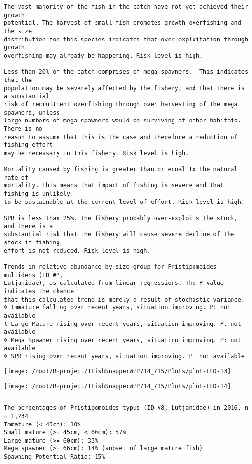 \documentclass{report}\usepackage[]{graphicx}\usepackage[]{color}
\makeatletter
\def\maxwidth{ %
  \ifdim\Gin@nat@width>\linewidth
    \linewidth
  \else
    \Gin@nat@width
  \fi
}
\newenvironment{kframe}{%
 \def\at@end@of@kframe{}%
 \ifinner\ifhmode%
  \def\at@end@of@kframe{\end{minipage}}%
  \begin{minipage}{\columnwidth}%
 \fi\fi%
 \def\FrameCommand##1{\hskip\@totalleftmargin \hskip-\fboxsep
 \colorbox{shadecolor}{##1}\hskip-\fboxsep
     \hskip-\linewidth \hskip-\@totalleftmargin \hskip\columnwidth}%
 \MakeFramed {\advance\hsize-\width
   \@totalleftmargin\z@ \linewidth\hsize
   \@setminipage}}%
 {\par\unskip\endMakeFramed%
 \at@end@of@kframe}
\newenvironment{knitrout}{}{} %
\makeatother
\begin{document}
\begin{knitrout}
\begin{kframe}
\begin{verbatim}
The vast majority of the fish in the catch have not yet achieved their growth
potential. The harvest of small fish promotes growth overfishing and the size
distribution for this species indicates that over exploitation through growth
overfishing may already be happening. Risk level is high.

Less than 20% of the catch comprises of mega spawners.  This indicates that the
population may be severely affected by the fishery, and that there is a substantial
risk of recruitment overfishing through over harvesting of the mega spawners, unless
large numbers of mega spawners would be surviving at other habitats. There is no
reason to assume that this is the case and therefore a reduction of fishing effort
may be necessary in this fishery. Risk level is high.
 
Mortality caused by fishing is greater than or equal to the natural rate of
mortality. This means that impact of fishing is severe and that fishing is unlikely
to be sustainable at the current level of effort. Risk level is high.
 
SPR is less than 25%. The fishery probably over-exploits the stock, and there is a
substantial risk that the fishery will cause severe decline of the stock if fishing
effort is not reduced. Risk level is high.
 
Trends in relative abundance by size group for Pristipomoides multidens (ID #7,
Lutjanidae), as calculated from linear regressions. The P value indicates the chance
that this calculated trend is merely a result of stochastic variance.
% Immature falling over recent years, situation improving. P: not available
% Large Mature rising over recent years, situation improving. P: not available
% Mega Spawner rising over recent years, situation improving. P: not available
% SPR rising over recent years, situation improving. P: not available
\end{verbatim}
\end{kframe}
\texttt{[image: /root/R-project/IFishSnapperWPP714\_715/Plots/plot-LFD-13]} 

\texttt{[image: /root/R-project/IFishSnapperWPP714\_715/Plots/plot-LFD-14]} 
\begin{kframe}\begin{verbatim}
\end{verbatim}
\end{kframe}
\clearpage
\newpage
\begin{kframe}\begin{verbatim}The percentages of Pristipomoides typus (ID #8, Lutjanidae) in 2016, n = 1,234
Immature (< 45cm): 10%
Small mature (>= 45cm, < 60cm): 57%
Large mature (>= 60cm): 33%
Mega spawner (>= 66cm): 14% (subset of large mature fish)
Spawning Potential Ratio: 15%
 

\end{verbatim}
\end{kframe}
\end{knitrout}
\end{document}
